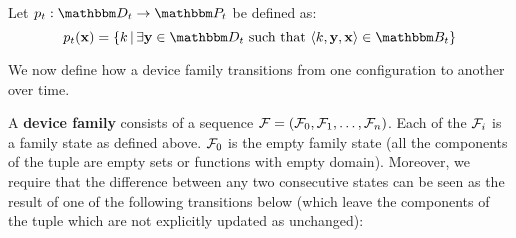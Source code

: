 \begin{definition}
Let $\zpuks_t : \zset{d}_t \rightarrow \zset{p}_t$ be defined as:
\[
  \zpuks_t(\zdev{x}) = \left\{
    \zkey{k} \, | \,
    \exists \zdev{y} \in \zset{d}_t \text{ such that }
    \langle \zkey{k}, \zdev{y}, \zdev{x} \rangle \in \zset{b}_t
  \right\}
\]
\end{definition}

We now define how a device family transitions from one configuration to another over time.

\begin{definition}
  \label{d:trans}
  A \textbf{device family} consists of a sequence $\mathcal{F} = (\mathcal{F}_0,\mathcal{F}_1,\dots,\mathcal{F}_n)$. Each of
  the $\mathcal{F}_i$ is a family state as defined above. $\mathcal{F}_0$ is the empty family state (all the
  components of the tuple are empty sets or functions with empty domain). Moreover, we require that
  the difference between any two consecutive states can be seen as the result of one of the
  following transitions below (which leave the components of the tuple which are not explicitly
  updated as unchanged):


\end{definition}
